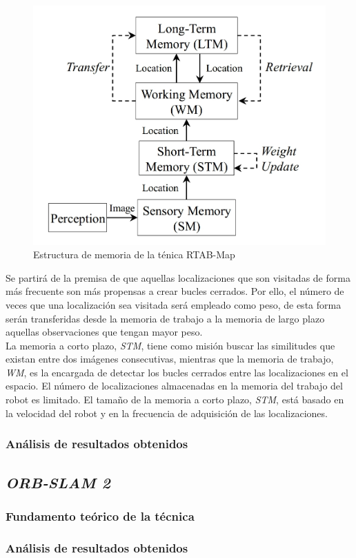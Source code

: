 \begin{figure}[h!]
    \centering
    \includegraphics[width=.4\textwidth]{images/rtabmap_memory}
    \caption{Estructura de memoria de la ténica RTAB-Map}
\end{figure}


Se partirá de la premisa de que aquellas localizaciones que son visitadas de forma más frecuente son más propensas a 
crear bucles cerrados. Por ello, el número de veces que una localización sea visitada será empleado como peso, de 
esta forma serán transferidas desde la memoria de trabajo a la memoria de largo plazo aquellas observaciones que 
tengan mayor peso.\\
La memoria a corto plazo, \textit{STM}, tiene como misión buscar las similitudes que existan entre dos imágenes
consecutivas, mientras que la memoria de trabajo, \textit{WM}, es la encargada de detectar los bucles cerrados entre las
localizaciones en el espacio. El número de localizaciones almacenadas en la memoria del trabajo del robot es
limitado. El tamaño de la memoria a corto plazo, \textit{STM}, está basado en la velocidad del robot y en la frecuencia de
adquisición de las localizaciones. \\

\subsubsection{Análisis de resultados obtenidos}

\subsection{\textit{ORB-SLAM 2}}
\subsubsection{Fundamento teórico de la técnica}
\subsubsection{Análisis de resultados obtenidos}